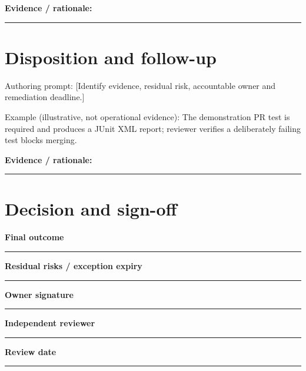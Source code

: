 \documentclass[11pt,letterpaper]{article}
\begin{document}
\noindent\textbf{Evidence / rationale:}\par\nobreak\vspace{8pt}\noindent\rule{0.93\linewidth}{0.4pt}\par\vspace{14pt}
\section{Disposition and follow-up}
Authoring prompt: [Identify evidence, residual risk, accountable owner and remediation deadline.]

Example (illustrative, not operational evidence): The demonstration PR test is required and produces a JUnit XML report; reviewer verifies a deliberately failing test blocks merging.

\noindent\textbf{Evidence / rationale:}\par\nobreak\vspace{8pt}\noindent\rule{0.93\linewidth}{0.4pt}\par\vspace{14pt}
\section{Decision and sign-off}
\noindent\textbf{Final outcome}\par\nobreak\vspace{6pt}\noindent\rule{0.93\linewidth}{0.4pt}\par\vspace{14pt}
\noindent\textbf{Residual risks / exception expiry}\par\nobreak\vspace{6pt}\noindent\rule{0.93\linewidth}{0.4pt}\par\vspace{14pt}
\noindent\textbf{Owner signature}\par\nobreak\vspace{6pt}\noindent\rule{0.93\linewidth}{0.4pt}\par\vspace{14pt}
\noindent\textbf{Independent reviewer}\par\nobreak\vspace{6pt}\noindent\rule{0.93\linewidth}{0.4pt}\par\vspace{14pt}
\noindent\textbf{Review date}\par\nobreak\vspace{6pt}\noindent\rule{0.93\linewidth}{0.4pt}\par\vspace{14pt}
\end{document}
